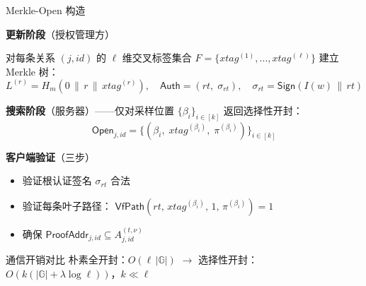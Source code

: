 \begin{frame}{Merkle-Open 构造}
\small
\setlength{\abovedisplayskip}{4pt}
\setlength{\belowdisplayskip}{4pt}

  \textbf{更新阶段}（授权管理方）

  对每条关系 $(j,\mathit{id})$ 的 $\ell$ 维交叉标签集合
  $F = \{\mathit{xtag}^{(1)}, \ldots, \mathit{xtag}^{(\ell)}\}$ 建立 Merkle 树：
  \[
    L^{(r)} = H_m(0 \,\|\, r \,\|\, \mathit{xtag}^{(r)}),
    \quad
    \mathsf{Auth} = (\mathit{rt},\; \sigma_\mathit{rt}),\quad
    \sigma_\mathit{rt} = \mathsf{Sign}(I(w) \,\|\, \mathit{rt})
  \]

  \textbf{搜索阶段}（服务器）——仅对采样位置 $\{\beta_i\}_{i \in [k]}$ 返回选择性开封：
  \[
    \mathsf{Open}_{j,\mathit{id}} = \bigl\{
      (\beta_i,\; \mathit{xtag}^{(\beta_i)},\; \pi^{(\beta_i)})
    \bigr\}_{i \in [k]}
  \]

  \textbf{客户端验证}（三步）
  \begin{itemize}[noitemsep, topsep=2pt]
    \item[1.] 验证根认证签名 $\sigma_\mathit{rt}$ 合法
    \item[2.] 验证每条叶子路径：
          $\mathsf{VfPath}(\mathit{rt},\, \mathit{xtag}^{(\beta_i)},\, 1,\, \pi^{(\beta_i)}) = 1$
    \item[3.] 确保 $\mathsf{ProofAddr}_{j,\mathit{id}} \subseteq A_{j,\mathit{id}}^{(t,\nu)}$
  \end{itemize}

  \vspace{0.3em}
  \begin{exampleblock}{通信开销对比}
    朴素全开封：$O(\ell\,|\mathbb{G}|)$
    \quad$\longrightarrow$\quad
    选择性开封：$O(k(|\mathbb{G}| + \lambda \log \ell))$，\quad $k \ll \ell$
  \end{exampleblock}

\end{frame}

